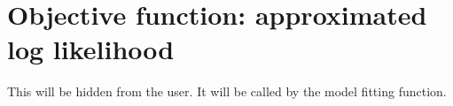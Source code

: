 \documentclass{article}
\begin{document}
%
%


\section{Objective function: approximated log likelihood}\label{sec:objfun}
This will be hidden from the user. It will be called by the model fitting function.
\end{document}
